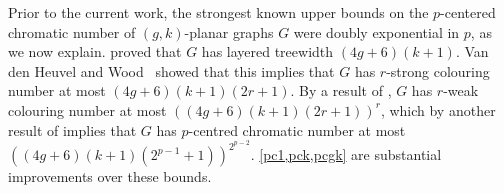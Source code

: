 \documentclass{patmorin}
\newcommand{\note}[2]{{\color{red}[#1:~#2]}}
\renewcommand{\geq}{\geqslant}
\begin{document}
Prior to the current work, the strongest known upper bounds on the $p$-centered chromatic number of $(g,k)$-planar graphs $G$ were doubly exponential in $p$, as we now explain. 
\citet{dujmovic.eppstein.ea:structure} proved that $G$ has layered treewidth $(4g+6)(k+1)$. 
Van den Heuvel and Wood~\citep{vdHW17} showed that this implies that $G$  has $r$-strong colouring number at most $(4g + 6)(k + 1)(2r + 1)$. By a result of \citet{zhu:colouring}, $G$ has $r$-weak colouring number at most $( (4g + 6)(k + 1)(2r + 1) )^r$, which by another result of  \citet{zhu:colouring} implies that $G$ has  $p$-centred chromatic number at most $( (4g+6)(k+1)(2^{p-1} + 1) )^{2^{p-2}}$. 
\cref{pc1,pck,pcgk} are substantial improvements over these bounds. 

% 
% 
% 
% 
% 
\end{document}
